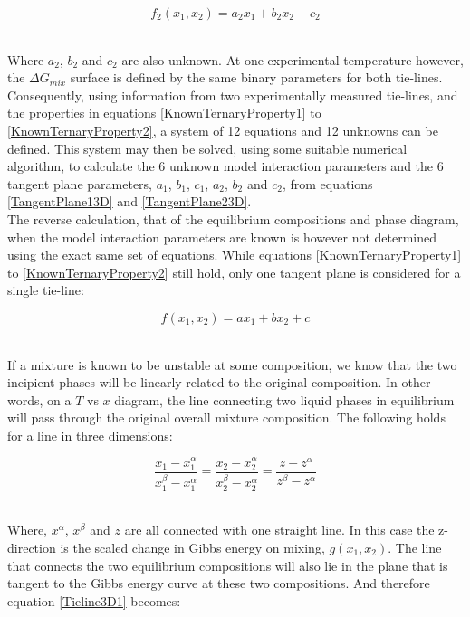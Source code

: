 \begin{equation}
f_{2}\left(x_{1}, x_{2}\right) = a_{2}x_{1} + b_{2}x_{2} +c_{2} \label{TangentPlane23D}
\end{equation}\

Where $a_{2}$, $b_{2}$ and $c_{2}$ are also unknown. At one experimental temperature however, the $\Delta G_{mix}$ surface is defined by the same binary parameters for both tie-lines. Consequently, using information from two experimentally measured tie-lines, and the properties in equations \ref{KnownTernaryProperty1} to \ref{KnownTernaryProperty2}, a system of 12 equations and 12 unknowns can be defined. This system may then be solved, using some suitable numerical algorithm, to calculate the 6 unknown model interaction parameters and the 6 tangent plane parameters, $a_{1}$, $b_{1}$, $c_{1}$, $a_{2}$, $b_{2}$ and $c_{2}$, from equations \ref{TangentPlane13D} and \ref{TangentPlane23D}.\\

The reverse calculation, that of the equilibrium compositions and phase diagram, when the model interaction parameters are known is however not determined using the exact same set of equations. While equations \ref{KnownTernaryProperty1} to \ref{KnownTernaryProperty2} still hold, only one tangent plane is considered for a single tie-line:\

\begin{equation}
f\left(x_{1}, x_{2}\right) = ax_{1} + bx_{2} +c \label{TangentPlane3D}
\end{equation}\

If a mixture is known to be unstable at some composition, we know that the two incipient phases will be linearly related to the original composition. In other words, on a $T$ vs $x$ diagram, the line connecting two liquid phases in equilibrium will pass through the original overall mixture composition. The following holds for a line in three dimensions:\

\begin{equation}
\dfrac{x_{1}- x_{1}^{\alpha}}{x_{1}^{\beta} - x_{1}^{\alpha}} = \dfrac{x_{2}- x_{2}^{\alpha}}{x_{2}^{\beta} - x_{2}^{\alpha}} = \dfrac{z- z^{\alpha}}{z^{\beta} - z^{\alpha}} \label{Tieline3D1}
\end{equation}\

Where, $x^{\alpha}$, $x^{\beta}$ and $z$ are all connected with one straight line. In this case the z-direction is the scaled change in Gibbs energy on mixing, $g\left(x_{1}, x_{2}\right)$. The line that connects the two equilibrium compositions will also lie in the plane that is tangent to the Gibbs energy curve at these two compositions. And therefore equation \ref{Tieline3D1} becomes:\

